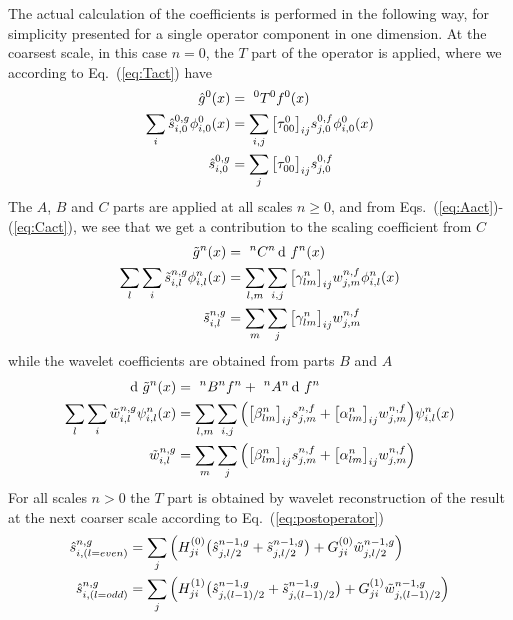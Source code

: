The actual calculation of the coefficients is performed in the following way,
for simplicity presented for a single operator component in one dimension.
At the coarsest scale, in this case $n=0$, the $T$ part of the operator is applied,
where we according to Eq.~(\ref{eq:Tact}) have
\begin{align}
    {\hat{g}}^{0}(x) &=\ ^{0}T^{0}{f}^{0}(x) \\
    \sum_i \hat{s}^{0,g}_{i,0}\phi_{i,0}^0(x)
	&= \sum_{i,j} \big[\tau^0_{00}\big]_{ij}
	s^{0,f}_{j,0}\phi_{i,0}^0(x) \\
    \hat{s}^{0,g}_{i,0} 
	&= \sum_j \big[\tau^0_{00}\big]_{ij} s^{0,f}_{j,0}
\end{align}
The $A$, $B$ and $C$ parts are applied at all scales $n\geq0$, and from 
Eqs.~(\ref{eq:Aact})-(\ref{eq:Cact}), we see that we get a contribution to the 
scaling coefficient from $C$
\begin{align}
    \scalingrep{\tilde{g}}{n}(x) &=\ \C{n}{n}\waveletrep{f}{n}(x) \\
    \sum_l\sum_i \tilde{\scalingcoef}^{n,g}_{i,l}\scaling_{i,l}^n(x)
	&= \sum_{l,m}\sum_{i,j} \big[\gamma^n_{lm}\big]_{ij}
	\waveletcoef^{n,f}_{j,m} \scaling_{i,l}^n(x) \\
    \tilde{\scalingcoef}^{n,g}_{i,l} 
	&= \sum_m\sum_j \big[\gamma^n_{lm}\big]_{ij} \waveletcoef^{n,f}_{j,m}
\end{align}
while the wavelet coefficients are obtained from parts $B$ and $A$
\begin{align}
    \waveletrep{\tilde{g}}{n}(x) &=\ 
	\B{n}{n}\scalingrep{f}{n} +\ \A{n}{n}\waveletrep{f}{n}\\
    \sum_l\sum_i \tilde{\waveletcoef}^{n,g}_{i,l}\wavelet_{i,l}^n(x)
	&= \sum_{l,m}\sum_{i,j} \Big(
	\big[\beta^n_{lm}\big]_{ij} \scalingcoef^{n,f}_{j,m} +
	\big[\alpha^n_{lm}\big]_{ij}\waveletcoef^{n,f}_{j,m}
	\Big) \wavelet_{i,l}^n(x) \\
    \tilde{\waveletcoef}^{n,g}_{i,l}
	&= \sum_{m}\sum_{j} \Big(
	\big[\beta^n_{lm}\big]_{ij} \scalingcoef^{n,f}_{j,m} +
	\big[\alpha^n_{lm}\big]_{ij}\waveletcoef^{n,f}_{j,m} \Big)
\end{align}
For all scales $n>0$ the $T$ part is obtained by wavelet reconstruction of the
result at the next coarser scale according to Eq.~(\ref{eq:postoperator}) 
\begin{align}
    \hat{s}^{n,g}_{i,(l=even)} &=
	\sum_j \Big(H_{ji}^{(0)}\big(
	\hat{s}_{j,l/2}^{n-1,g} + 
	\tilde{s}_{j,l/2}^{n-1,g} \big) + 
	G_{ji}^{(0)} \tilde{w}_{j,l/2}^{n-1,g} \Big)\\
    \hat{s}^{n,g}_{i,(l=odd)} &=
	\sum_j \Big(H_{ji}^{(1)}\big(
	\hat{s}_{j,(l-1)/2}^{n-1,g} +  
	\tilde{s}_{j,(l-1)/2}^{n-1,g} \big) + 
	G_{ji}^{(1)} \tilde{w}_{j,(l-1)/2}^{n-1,g} \Big)
\end{align}

